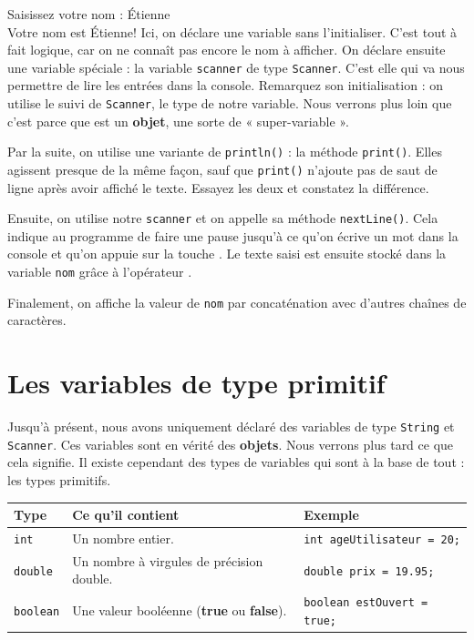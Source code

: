 \documentclass[12pt]{report}
\newcommand{\commande}[1]{%
\tcbox[on line, size=fbox, colframe=black, boxrule=0.75pt, tcbox raise base]{#1} %
}
\newenvironment{console}
	{
	\tcolorbox[title={Sortie console}, sharp corners = south, boxsep = 1.5mm]{} \tt
	}{\endtcolorbox}
\begin{document}
\begin{console}
Saisissez votre nom : {\color{blue} Étienne}\\
Votre nom est Étienne!
\end{console}
Ici, on déclare une variable sans l'initialiser. C'est tout à fait logique, car on ne connaît pas encore le nom à afficher. On déclare ensuite une variable spéciale : la variable \texttt{scanner} de type \texttt{Scanner}. C'est elle qui va nous permettre de lire les entrées dans la console. Remarquez son initialisation : on utilise le \commande{new} suivi de \texttt{Scanner}, le type de notre variable. Nous verrons plus loin que c'est parce que \commande{scanner} est un \textbf{objet}, une sorte de « super-variable ». 

Par la suite, on utilise une variante de \texttt{println()} : la méthode \texttt{print()}. Elles agissent presque de la même façon, sauf que \texttt{print()} n'ajoute pas de saut de ligne après avoir affiché le texte. Essayez les deux et constatez la différence.

Ensuite, on utilise notre \texttt{scanner} et on appelle sa méthode \texttt{nextLine()}. Cela indique au programme de faire une pause jusqu'à ce qu'on écrive un mot dans la console et qu'on appuie sur la touche \commande{Entrée}. Le texte saisi est ensuite stocké dans la variable \texttt{nom} grâce à l'opérateur \commande{=}.

Finalement, on affiche la valeur de \texttt{nom} par concaténation avec d'autres chaînes de caractères. 


%
\section{Les variables de type primitif}
%
Jusqu'à présent, nous avons uniquement déclaré des variables de type \texttt{String} et \texttt{Scanner}. Ces variables sont en vérité des \textbf{objets}. Nous verrons plus tard ce que cela signifie. Il existe cependant des types de variables qui sont à la base de tout : les types primitifs. 

\begin{center}
	\renewcommand{\arraystretch}{1.5}
	\begin{tabular*}{\linewidth}{@{\extracolsep{\fill} } l l l} \toprule
		\textbf{Type} & \textbf{Ce qu'il contient} & \textbf{Exemple} \\ \midrule
		\texttt{int} & Un nombre entier. & \texttt{int ageUtilisateur = 20;} \\
		\texttt{double} & Un nombre à virgules de précision double. & \texttt{double prix = 19.95;} \\
		\texttt{boolean} & Une valeur booléenne (\textbf{true} ou \textbf{false}). & \texttt{boolean estOuvert = true;} \\ \bottomrule
	\end{tabular*}
\end{center}
\end{document}
